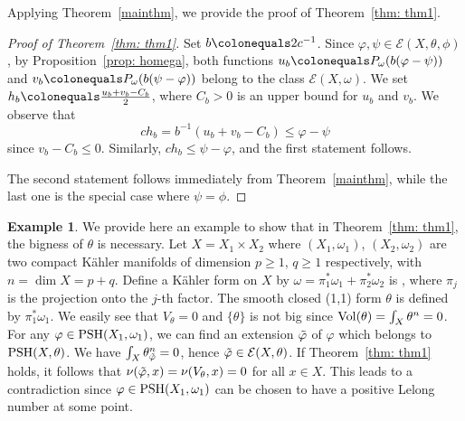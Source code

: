 \documentclass[a4paper]{amsart}
\numberwithin{equation}{section}
\newtheorem{theorem}{Theorem}[section]
\theoremstyle{definition}
\newtheorem{example}[theorem]{Example}
\newcommand{\Vol}{{\rm Vol}}
\numberwithin{equation}{section}
\newcommand{\PSH}{{\rm PSH}}
\begin{document}
Applying Theorem~\ref{mainthm}, we provide the proof of Theorem~\ref{thm: thm1}.
\begin{proof}[Proof of Theorem~\ref{thm: thm1}]
Set $b\colonequals 2c^{-1}$. Since $\varphi,\psi\in\mathcal{E}(X,\theta,\phi)$, by Proposition~\ref{prop: homega}, both functions $u_b\colonequals P_\omega(b(\varphi-\psi))$ and $v_b\colonequals P_\omega(b(\psi-\varphi))$ belong to the class $\mathcal{E}(X,\omega)$. We set
$h_b\colonequals\frac{u_b+v_b-C_b}{2}$, where $C_b>0$ is an upper bound for $u_b$ and $v_b$. We observe that
\[ch_b=b^{-1}(u_b+v_b-C_b)\leq \varphi-\psi \] since $v_b-C_b\leq 0$.  Similarly, $ch_b\leq \psi-\varphi$, and the first statement follows.   

The second statement follows immediately from Theorem~\ref{mainthm}, while the last one is the special case where $\psi=\phi$.  
\end{proof}

\begin{example}
We provide here an example to show that in Theorem~\ref{thm: thm1}, the bigness of $\theta$ is necessary. Let $X=X_1\times X_2$ where $(X_1,\omega_1)$, $(X_2,\omega_2)$ are two compact K\"ahler manifolds of dimension $p\geq 1$, $q\geq 1$ respectively, with $n=\dim X=p+q$.  
Define a K\"ahler form on $X$ by $\omega=\pi_1^*\omega_1+\pi_2^*\omega_2$ is , where $\pi_j$ is the projection onto the $j$-th factor.
The smooth closed (1,1) form $\theta$ is defined by $\pi_1^*\omega_1$. We easily see that $V_\theta=0$ and $\{\theta\}$ is not big since $\Vol(\theta)=\int_X\theta^n=0$. 
For any $\varphi\in\PSH(X_1,\omega_1)$, we can find an extension $\Tilde{\varphi}$  of $\varphi$ which belongs to $\PSH(X,\theta)$. 
We have $\int_X\theta_{\Tilde{\varphi}}^n=0$, hence $\Tilde{\varphi}\in\mathcal{E}(X,\theta)$. If Theorem~\ref{thm: thm1} holds, it follows that $\nu(\Tilde\varphi,x)=\nu(V_\theta,x)=0$ for all $x\in X$. This leads to a contradiction since  $\varphi\in\PSH(X_1,\omega_1)$ can be chosen to have a positive Lelong number at some point.
\end{example}
\end{document}
